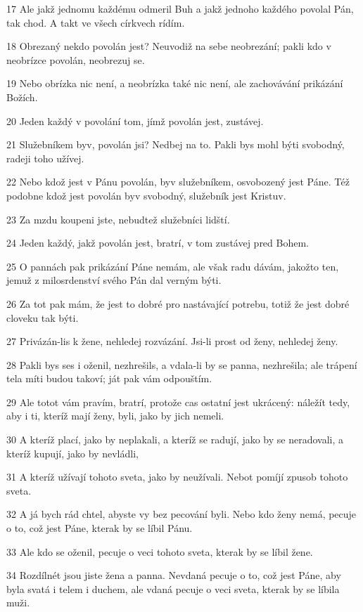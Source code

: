 \par 17 Ale jakž jednomu každému odmeril Buh a jakž jednoho každého povolal Pán, tak chod. A takt ve všech církvech rídím.
\par 18 Obrezaný nekdo povolán jest? Neuvodiž na sebe neobrezání; pakli kdo v neobrízce povolán, neobrezuj se.
\par 19 Nebo obrízka nic není, a neobrízka také nic není, ale zachovávání prikázání Božích.
\par 20 Jeden každý v povolání tom, jímž povolán jest, zustávej.
\par 21 Služebníkem byv, povolán jsi? Nedbej na to. Pakli bys mohl býti svobodný, radeji toho užívej.
\par 22 Nebo kdož jest v Pánu povolán, byv služebníkem, osvobozený jest Páne. Též podobne kdož jest povolán byv svobodný, služebník jest Kristuv.
\par 23 Za mzdu koupeni jste, nebudtež služebníci lidští.
\par 24 Jeden každý, jakž povolán jest, bratrí, v tom zustávej pred Bohem.
\par 25 O pannách pak prikázání Páne nemám, ale však radu dávám, jakožto ten, jemuž z milosrdenství svého Pán dal verným býti.
\par 26 Za tot pak mám, že jest to dobré pro nastávající potrebu, totiž že jest dobré cloveku tak býti.
\par 27 Privázán-lis k žene, nehledej rozvázání. Jsi-li prost od ženy, nehledej ženy.
\par 28 Pakli bys ses i oženil, nezhrešils, a vdala-li by se panna, nezhrešila; ale trápení tela míti budou takoví; ját pak vám odpouštím.
\par 29 Ale totot vám pravím, bratrí, protože cas ostatní jest ukrácený: náležít tedy, aby i ti, kteríž mají ženy, byli, jako by jich nemeli.
\par 30 A kteríž plací, jako by neplakali, a kteríž se radují, jako by se neradovali, a kteríž kupují, jako by nevládli,
\par 31 A kteríž užívají tohoto sveta, jako by neužívali. Nebot pomíjí zpusob tohoto sveta.
\par 32 A já bych rád chtel, abyste vy bez pecování byli. Nebo kdo ženy nemá, pecuje o to, což jest Páne, kterak by se líbil Pánu.
\par 33 Ale kdo se oženil, pecuje o veci tohoto sveta, kterak by se líbil žene.
\par 34 Rozdílnét jsou jiste žena a panna. Nevdaná pecuje o to, což jest Páne, aby byla svatá i telem i duchem, ale vdaná pecuje o veci sveta, kterak by se líbila muži.
